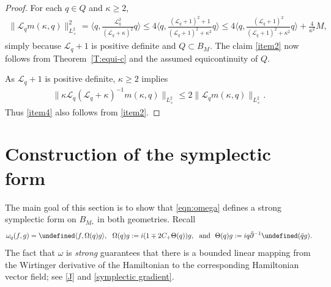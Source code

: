 \documentclass{amsart}
\numberwithin{equation}{section}
\theoremstyle{definition}
\newcommand{\om}{\omega}
\newcommand{\Om}{\Omega}
\newcommand{\ka}{\kappa}
\newcommand{\Lc}{\mathcal{L}}
\newcommand{\dd}{\partial}
\newcommand{\lan}{\langle}
\newcommand{\ran}{\rangle}
\let\Re=\undefined\DeclareMathOperator{\Re}{Re}
\begin{document}
\begin{proof}
For each $q\in Q$ and $\kappa\geq 2$,
\begin{align*}
\|\Lc_q m(\ka,q)\|_{L^2_+}^2 = \bigl\langle q,\tfrac{\Lc_q^2}{(\Lc_q+\kappa)^2} q \bigr\rangle
	\leq 4 \bigl\langle q,\tfrac{(\Lc_q+1)^2+1}{(\Lc_q+1)^2+\kappa^2} q \bigr\rangle
	\leq 4 \bigl\langle q,\tfrac{(\Lc_q+1)^2}{(\Lc_q+1)^2+\kappa^2} q \bigr\rangle + \tfrac{4}{\kappa^2} M ,
\end{align*}
simply because $\Lc_q+1$ is positive definite and $Q \subset B_M$.  The claim \eqref{item2} now follows from Theorem~\ref{T:equi-c} and the assumed equicontinuity of $Q$.


As $\Lc_q+1$ is positive definite, $\kappa\geq 2$ implies 
\begin{align*}
\|\ka \Lc_q (\Lc_q+\ka)^{-1}m(\ka,q)\|_{L^2_+} \leq 2  \| \Lc_q m(\kappa, q)\|_{L^2_+}.
\end{align*}
Thus \eqref{item4} also follows from \eqref{item2}.
\end{proof}

\section{Construction of the symplectic form}\label{sec:construction}


The main goal of this section is to show that \eqref{eqn:omega} defines a strong symplectic form on $B_{M_*}$ in both geometries.  Recall
\begin{equation*}
\om_q(f,g)=\Re\lan f,\Om (q)g\ran, \ \ \Om (q)g:=i(1\mp2 C_+ \Theta(q))g,\ \ \text{and} \ \   \Theta(q)g:=iq\tilde{\dd}^{-1}\Re(\bar{q}g).
\end{equation*}
The fact that $\omega$ is \emph{strong} guarantees that there is a bounded linear mapping from the Wirtinger derivative of the Hamiltonian to the corresponding Hamiltonian vector field; see \eqref{J} and \eqref{symplectic gradient}.
\end{document}
